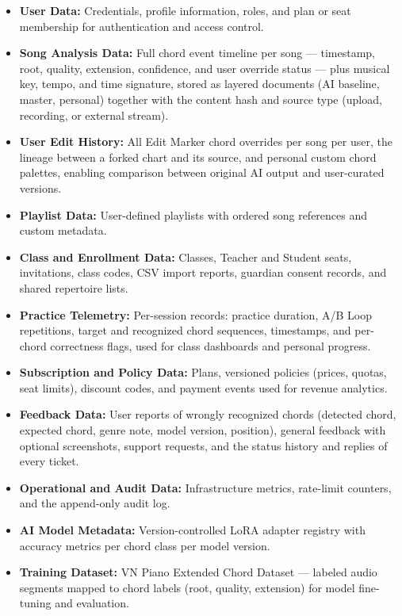 \documentclass[a4paper]{article}
\begin{document}
\begin{itemize}
    \item \textbf{User Data:} Credentials, profile information, roles, and plan or seat membership for authentication and access control.
    \item \textbf{Song Analysis Data:} Full chord event timeline per song --- timestamp, root, quality, extension, confidence, and user override status --- plus musical key, tempo, and time signature, stored as layered documents (AI baseline, master, personal) together with the content hash and source type (upload, recording, or external stream).
    \item \textbf{User Edit History:} All Edit Marker chord overrides per song per user, the lineage between a forked chart and its source, and personal custom chord palettes, enabling comparison between original AI output and user-curated versions.
    \item \textbf{Playlist Data:} User-defined playlists with ordered song references and custom metadata.
    \item \textbf{Class and Enrollment Data:} Classes, Teacher and Student seats, invitations, class codes, CSV import reports, guardian consent records, and shared repertoire lists.
    \item \textbf{Practice Telemetry:} Per-session records: practice duration, A/B Loop repetitions, target and recognized chord sequences, timestamps, and per-chord correctness flags, used for class dashboards and personal progress.
    \item \textbf{Subscription and Policy Data:} Plans, versioned policies (prices, quotas, seat limits), discount codes, and payment events used for revenue analytics.
    \item \textbf{Feedback Data:} User reports of wrongly recognized chords (detected chord, expected chord, genre note, model version, position), general feedback with optional screenshots, support requests, and the status history and replies of every ticket.
    \item \textbf{Operational and Audit Data:} Infrastructure metrics, rate-limit counters, and the append-only audit log.
    \item \textbf{AI Model Metadata:} Version-controlled LoRA adapter registry with accuracy metrics per chord class per model version.
    \item \textbf{Training Dataset:} VN Piano Extended Chord Dataset --- labeled audio segments mapped to chord labels (root, quality, extension) for model fine-tuning and evaluation.
\end{itemize}
\end{document}
